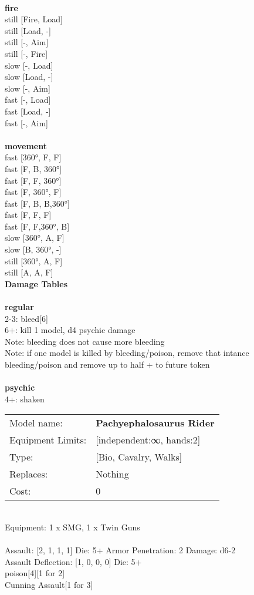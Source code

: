 \ \\ {\bf fire } \\
still [Fire, Load] \\
still [Load, -] \\
still [-, Aim] \\
still [-, Fire] \\
slow [-, Load] \\
slow [Load, -] \\
slow [-, Aim] \\
fast [-, Load] \\
fast [Load, -] \\
fast [-, Aim] \\
\ \\ {\bf movement } \\
fast [360°, F, F] \\
fast [F, B, 360°] \\
fast [F, F, 360°] \\
fast [F, 360°, F] \\
fast [F, B, B,360°] \\
fast [F, F, F] \\
fast [F, F,360°, B] \\
slow [360°, A, F] \\
slow [B, 360°, -] \\
still [360°, A, F] \\
still [A, A, F] \\


{\bf Damage Tables} \\
\ \\ {\bf regular } \\
2-3: bleed[6] \\
6+: kill 1 model, d4 psychic damage \\
Note: bleeding does not cause more bleeding \\
Note: if one model is killed by bleeding/poison, remove that intance \\ bleeding/poison and remove up to half + to future token \\
\ \\ {\bf psychic } \\
4+: shaken \\


\noindent
\begin{tabular}{ll}
Model name: &{\bf Pachyephalosaurus Rider } \\
Equipment Limits: &[independent:∞, hands:2] \\
Type: &[Bio, Cavalry, Walks] \\
Replaces: &Nothing \\
Cost: & 0\\
\end{tabular}
\ \\
Equipment: 1 x SMG, 1 x Twin Guns \\
\ \\
Assault: [2, 1, 1, 1] Die: 5+ Armor Penetration: 2 Damage: d6-2 \\
Assault Deflection: [1, 0, 0, 0] Die: 5+\\
\indent poison[4][1 for 2]\\ 
Cunning Assault[1 for 3]\\ 
 
